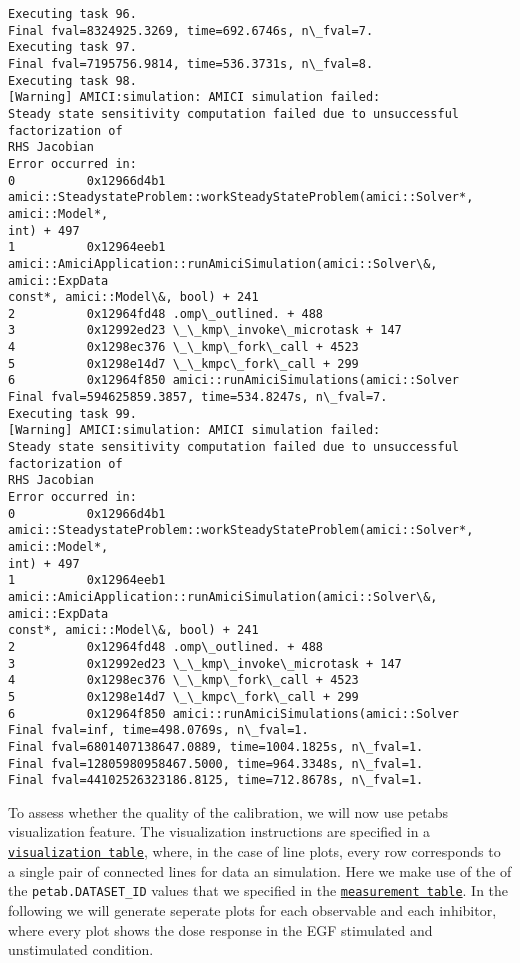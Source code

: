 \documentclass[11pt]{article}
\begin{document}
\begin{Verbatim}[commandchars=\\\{\}]
Executing task 96.
Final fval=8324925.3269, time=692.6746s, n\_fval=7.
Executing task 97.
Final fval=7195756.9814, time=536.3731s, n\_fval=8.
Executing task 98.
[Warning] AMICI:simulation: AMICI simulation failed:
Steady state sensitivity computation failed due to unsuccessful factorization of
RHS Jacobian
Error occurred in:
0          0x12966d4b1
amici::SteadystateProblem::workSteadyStateProblem(amici::Solver*, amici::Model*,
int) + 497
1          0x12964eeb1
amici::AmiciApplication::runAmiciSimulation(amici::Solver\&, amici::ExpData
const*, amici::Model\&, bool) + 241
2          0x12964fd48 .omp\_outlined. + 488
3          0x12992ed23 \_\_kmp\_invoke\_microtask + 147
4          0x1298ec376 \_\_kmp\_fork\_call + 4523
5          0x1298e14d7 \_\_kmpc\_fork\_call + 299
6          0x12964f850 amici::runAmiciSimulations(amici::Solver
Final fval=594625859.3857, time=534.8247s, n\_fval=7.
Executing task 99.
[Warning] AMICI:simulation: AMICI simulation failed:
Steady state sensitivity computation failed due to unsuccessful factorization of
RHS Jacobian
Error occurred in:
0          0x12966d4b1
amici::SteadystateProblem::workSteadyStateProblem(amici::Solver*, amici::Model*,
int) + 497
1          0x12964eeb1
amici::AmiciApplication::runAmiciSimulation(amici::Solver\&, amici::ExpData
const*, amici::Model\&, bool) + 241
2          0x12964fd48 .omp\_outlined. + 488
3          0x12992ed23 \_\_kmp\_invoke\_microtask + 147
4          0x1298ec376 \_\_kmp\_fork\_call + 4523
5          0x1298e14d7 \_\_kmpc\_fork\_call + 299
6          0x12964f850 amici::runAmiciSimulations(amici::Solver
Final fval=inf, time=498.0769s, n\_fval=1.
Final fval=6801407138647.0889, time=1004.1825s, n\_fval=1.
Final fval=12805980958467.5000, time=964.3348s, n\_fval=1.
Final fval=44102526323186.8125, time=712.8678s, n\_fval=1.
    \end{Verbatim}

    To assess whether the quality of the calibration, we will now use petabs
visualization feature. The visualization instructions are specified in a
\href{https://petab.readthedocs.io/en/latest/documentation_data_format.html\#visualization-table}{\texttt{visualization\ table}},
where, in the case of line plots, every row corresponds to a single pair
of connected lines for data an simulation. Here we make use of the of
the \texttt{petab.DATASET\_ID} values that we specified in the
\href{https://petab.readthedocs.io/en/latest/documentation_data_format.html\#measurement-table}{\texttt{measurement\ table}}.
In the following we will generate seperate plots for each observable and
each inhibitor, where every plot shows the dose response in the EGF
stimulated and unstimulated condition.
\end{document}
